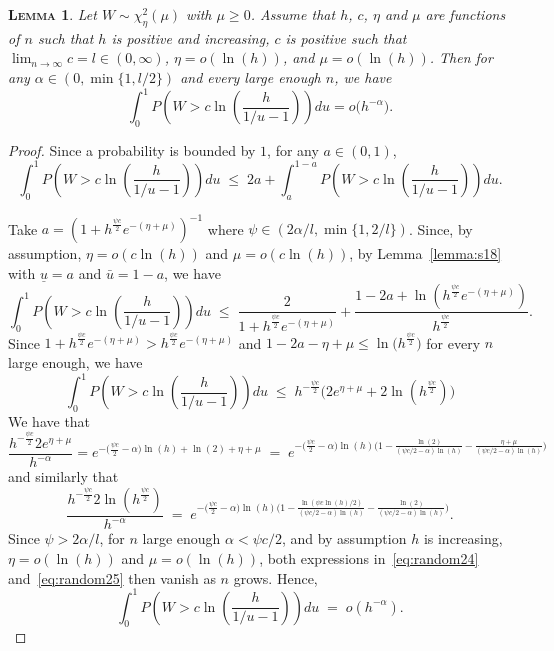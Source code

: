 \documentclass[
  12pt]{article}
\newtheorem{lem}[thm]{\textsc{Lemma}}
\begin{document}
\begin{lem}\label{lemma:s20}
 Let $W\sim \chi_\eta^2(\mu)$ with $\mu \geq 0$. Assume that $h$, $c$, $\eta$ and $\mu$ are functions of $n$ such that $h$ is positive and increasing, $c$ is positive such that $\lim_{n\to\infty}c = l \in (0,\infty)$, $\eta=o(\ln(h))$, and $\mu=o(\ln(h))$. Then for any $\alpha\in(0,\min\{1,l/2\})$ and every large enough $n$, we have
$$
\int_0^1 P\left(W>c \ln \left(\frac{h}{1 / u-1}\right)\right) d u = o\big(  h^{-\alpha}\big).$$
\end{lem}


\begin{proof}
Since a probability is bounded by $1$, for any $a\in(0,1)$,
\begin{equation}\label{eq:basebound}
    \int_0^1 P\left(W>c \ln \left(\frac{h}{1 / u-1}\right)\right) d u \;\leq\; 2 a+\int_{a}^{1-a} P\left(W>c\ln\left(\frac{h}{1 / u-1}\right)\right) d u.
\end{equation}

Take $a=\left(1+h^{\frac{\psi c}{2}}e^{-(\eta+\mu)}\right)^{-1}$ where $\psi\in(2\alpha/l,\min\{1,2/l\})$. Since, by assumption, $\eta=o(c\ln(h))$ and $\mu=o(c\ln(h))$, by Lemma~\ref{lemma:s18} with $\underline{u}=a$ and $\bar{u}=1-a$, we have
$$
\int_0^1 P\left(W>c \ln \left(\frac{h}{1 / u-1}\right)\right) d u \;\leq\; \frac{2}{1+h^{\frac{\psi c}{2}}e^{-(\eta+\mu)}}+ 
\frac{1-2a+\ln(h^{\frac{\psi c}{2}}e^{-(\eta+\mu)})}{h^{\frac{\psi c}{2}}}. $$
Since $1+h^{\frac{\psi c}{2}}e^{-(\eta+\mu)}>h^{\frac{\psi c}{2}}e^{-(\eta+\mu)}$ and $1-2a-\eta+\mu\leq \ln\big(h^{\frac{\psi c}{2}}\big)$ for every $n$ large enough, we have
$$
\int_0^1 P\left(W>c \ln \left(\frac{h}{1 / u-1}\right)\right) d u \;\leq\; h^{-\frac{\psi c}{2}}\big(2e^{\eta+\mu}+2\ln(h^{\frac{\psi c}{2}})\big) $$
We have that
\begin{equation}\label{eq:random24}
    \frac{h^{-\frac{\psi c}{2}}2e^{\eta+\mu}}{h^{-\alpha}} 
= e^{-\big(\frac{\psi c}{2}-\alpha\big) \ln(h) + \ln(2) + \eta + \mu}
    \;=\;e^{-\big(\frac{\psi c}{2}-\alpha\big)\ln(h)\big(1-\frac{\ln(2)}{(\psi c/2-\alpha)\ln(h)}-\frac{\eta+\mu}{(\psi c/2-\alpha)\ln(h)}\big)}
\end{equation}
and similarly that
\begin{equation}\label{eq:random25}
    \frac{h^{-\frac{\psi c}{2}}2\ln(h^{\frac{\psi c}{2}})}{h^{-\alpha}} \;=\;e^{-\big(\frac{\psi c}{2}-\alpha\big)\ln(h)\big(1-\frac{\ln(\psi c\ln(h)/2)}{(\psi c/2-\alpha)\ln(h)}- \frac{\ln(2)}{(\psi c/2-\alpha)\ln(h)}\big)}.
\end{equation}
Since $\psi>2\alpha/l$, for $n$ large enough $\alpha<\psi c/2$, and by assumption $h$ is increasing, $\eta=o(\ln(h))$ and $\mu=o(\ln(h))$, both expressions in~\eqref{eq:random24} and~\eqref{eq:random25} then 
vanish as $n$ grows. Hence, 
$$\int_0^1 P\left(W>c \ln \left(\frac{h}{1 / u-1}\right)\right) d u \;=\; o(h^{-\alpha}).$$
\end{proof}
\end{document}

